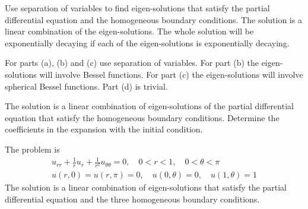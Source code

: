 {%
\begin{Hint}
  \label{hint magnet winding}
  Use separation of variables to find eigen-solutions that satisfy the partial
  differential equation and the homogeneous boundary conditions.  The solution
  is a linear combination of the eigen-solutions.  The whole solution will 
  be exponentially decaying if each of the eigen-solutions is exponentially
  decaying.
\end{Hint}





\begin{Hint}
  \label{hint e-folding time}
  For parts (a), (b) and (c) use separation of variables.  
  For part (b) the eigen-solutions will involve Bessel functions.  
  For part (c) the eigen-solutions will involve spherical Bessel functions.
  Part (d) is trivial.
\end{Hint}



\begin{Hint}
  \label{hint heat rectangle non-constant diffusivity}
  The solution is a linear combination of eigen-solutions of the partial 
  differential equation that satisfy the homogeneous boundary conditions.
  Determine the coefficients in the expansion with the initial condition.
\end{Hint}





\begin{Hint}
  \label{hint potential semi-circular rod}
  The problem is
  \begin{gather*}
    u_{r r} + \frac{1}{r} u_r + \frac{1}{r^2} 
    u_{\theta\theta} = 0, \quad 0 < r < 1, \quad 0 < \theta < \pi \\
    u(r,0) = u(r,\pi) = 0, \quad u(0,\theta) = 0, \quad u(1,\theta) = 1
  \end{gather*}
  The solution is a linear combination of eigen-solutions that satisfy the
  partial differential equation and the three homogeneous boundary conditions.
\end{Hint}





\begin{Hint}
  \label{hint heat semi-infinite rectangular slab}
\end{Hint}



}
